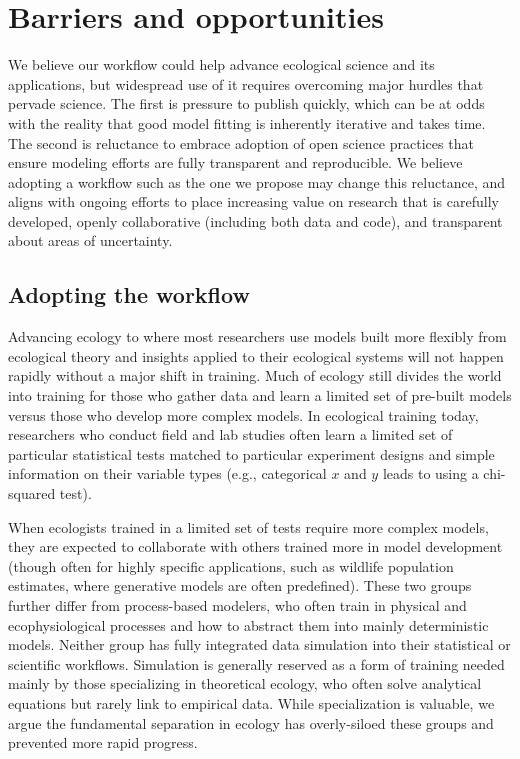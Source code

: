 \documentclass[11pt]{article}
\begin{document}
\clearpage
\section{Barriers and opportunities}

We believe our workflow could help advance ecological science and its applications, but widespread use of it requires overcoming major hurdles that pervade science.  
The first is pressure to publish quickly, which can be at odds with the reality that good model fitting is inherently iterative and takes time. The second is reluctance to embrace adoption of open science practices that ensure modeling efforts are fully transparent and reproducible. 
We believe adopting a workflow such as the one we propose may change this reluctance, and aligns with ongoing efforts to place increasing value on research that is carefully developed, openly collaborative (including both data and code), and transparent about areas of uncertainty.

\subsection{Adopting the workflow}

Advancing ecology to where most researchers use models built more flexibly from ecological theory and insights applied to their ecological systems will not happen rapidly without a major shift in training. Much of ecology still divides the world into training for those who gather data and learn a limited set of pre-built models versus those who develop more complex models. In ecological training today, researchers who conduct field and lab studies often learn a limited set of particular statistical tests matched to particular experiment designs and simple information on their variable types (e.g., categorical $x$ and $y$ leads to using a chi-squared test).

When ecologists trained in a limited set of tests require more complex models, they are expected to collaborate with others trained more in model development (though often for highly specific applications, such as wildlife population estimates, where generative models are often predefined). These two groups further differ from process-based modelers, who often train in physical and ecophysiological processes and how to abstract them into mainly deterministic models.
Neither group has fully integrated data simulation into their statistical or scientific workflows. Simulation is generally reserved as a form of training needed mainly by those specializing in theoretical ecology, who often solve analytical equations but rarely link to empirical data. While specialization is valuable, we argue the fundamental %
separation in ecology has overly-siloed these groups and prevented more rapid progress.
\end{document}
